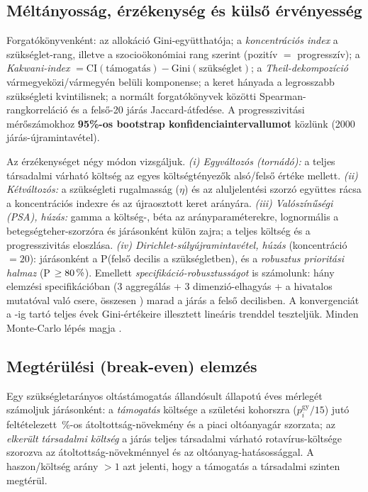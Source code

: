 \documentclass[11pt,a4paper]{article}
\begin{document}
\subsection{Méltányosság, érzékenység és külső érvényesség}
Forgatókönyvenként: az allokáció Gini-együtthatója; a \emph{koncentrációs
index} a szükséglet-rang, illetve a szocioökonómiai rang szerint (pozitív $=$
progresszív); a \emph{Kakwani-index} $= \mathrm{CI}(\text{támogatás}) -
\mathrm{Gini}(\text{szükséglet})$; a \emph{Theil-dekompozíció}
vármegyeközi/vármegyén belüli komponense; a keret hányada a legrosszabb
szükségleti kvintilisnek; a normált forgatókönyvek közötti
Spearman-rangkorreláció és a felső-20 járás Jaccard-átfedése. A
progresszivitási mérőszámokhoz \textbf{95\%-os bootstrap
konfidenciaintervallumot} közlünk (2000 járás-újramintavétel).

Az érzékenységet négy módon vizsgáljuk. \emph{(i) Egyváltozós (tornádó):} a
teljes társadalmi várható költség az egyes költségtényezők alsó/felső értéke
mellett. \emph{(ii) Kétváltozós:} a szükségleti rugalmasság ($\eta$) és az
aluljelentési szorzó együttes rácsa a koncentrációs indexre és az
újraosztott keret arányára. \emph{(iii) Valószínűségi (PSA), \psaDraws{}
húzás:} gamma a költség-, béta az arányparaméterekre, lognormális a
betegségteher-szorzóra és járásonként külön zajra; a teljes költség és a
progresszivitás eloszlása. \emph{(iv) Dirichlet-súlyújramintavétel, \wDraws{}
húzás} (koncentráció $=20$): járásonként a P(felső decilis a szükségletben),
és a \emph{robusztus prioritási halmaz} (P $\ge 80\,\%$).
Emellett \emph{specifikáció-robusztusságot} is számolunk: hány elemzési
specifikációban (3 aggregálás + 3 dimenzió-elhagyás + a hivatalos mutatóval
való csere, összesen \nSpecs) marad a járás a felső decilisben. A
konvergenciát a \csYear-ig tartó teljes évek Gini-értékeire illesztett
lineáris trenddel teszteljük. Minden Monte-Carlo lépés magja \seed.

\subsection{Megtérülési (break-even) elemzés}
Egy szükségletarányos oltástámogatás állandósult állapotú éves mérlegét
számoljuk járásonként: a \emph{támogatás} költsége a születési kohorszra
($p^{\text{gy}}_i/15$) jutó feltételezett \ceUptakeGain\,\%-os
átoltottság-növekmény és a piaci oltóanyagár szorzata; az \emph{elkerült
társadalmi költség} a járás teljes társadalmi várható rotavírus-költsége
szorozva az átoltottság-növekménnyel és az oltóanyag-hatásossággal. A
haszon/költség arány $>1$ azt jelenti, hogy a támogatás a társadalmi szinten
megtérül.
\end{document}
